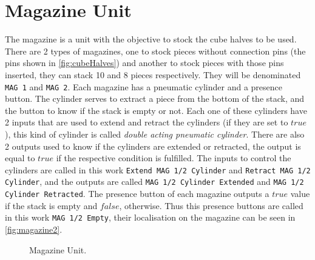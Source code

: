 \section{Magazine Unit}
\label{sec:magazine}
The magazine is a unit with the objective to stock the cube halves to be used.
There are 2 types of magazines, one to stock pieces without connection pins (the pins shown in \autoref{fig:cubeHalves}) and another to
 stock pieces with those pins inserted, they can stack 10 and 8 pieces
 respectively. They will be denominated \verb| MAG 1| and \verb|MAG 2|.
Each magazine has a pneumatic cylinder and a presence button. The cylinder serves to extract a
piece from the bottom of the stack, and the button to know if the stack is empty
or not. Each one of these cylinders have 2 inputs that are used to extend and retract the cylinders (if they
are set to $true$), this kind of cylinder is called \emph{double acting
  pneumatic cylinder}. There are also 2
outputs  used to know if the cylinders are extended or retracted, the output
is equal to $true$ if the respective condition is fulfilled. The inputs to
control the cylinders are called in this work \verb|Extend MAG 1/2 Cylinder| and
\verb|Retract MAG 1/2 Cylinder|, and the outputs are called \verb|MAG 1/2 Cylinder Extended| and
\verb|MAG 1/2 Cylinder Retracted|. The presence button of each magazine outputs a $true$
value if the stack is empty and $false$, otherwise. Thus this presence buttons
are called in this work \verb|MAG 1/2 Empty|, their localisation on the magazine
can be seen in \autoref{fig:magazine2}. 
\begin{figure}[H]
  \centering
  \caption{Magazine Unit.}
  \label{fig:magazine2}
\end{figure}

